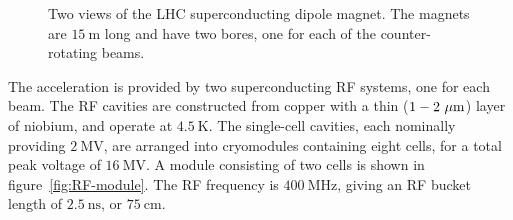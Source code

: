 \begin{figure}[htbp]
	\centering
	\hfill
	\caption{Two views of the LHC superconducting dipole magnet. The magnets are $15~\mbox{m}$ long and have two bores, one for each of the counter-rotating beams.}
	\label{fig:LHC-dipole-magnets}
\end{figure}

The acceleration is provided by two superconducting RF systems, one for each beam. The RF cavities are constructed from copper with a thin ($1-2~\mu\mathrm{m}$) layer of niobium, and operate at $4.5~\mbox{K}$. The single-cell cavities, each nominally providing $2~\mbox{MV}$, are arranged into cryomodules containing eight cells, for a total peak voltage of $16~\mbox{MV}$. A module consisting of two cells is shown in figure~\ref{fig:RF-module}. The RF frequency is $400~\mbox{MHz}$, giving an RF bucket length of $2.5~\mbox{ns}$, or $75~\mbox{cm}$. 

